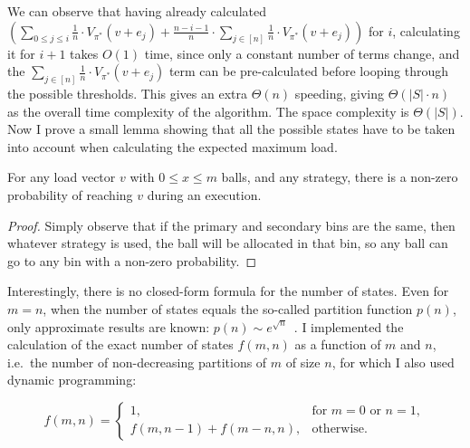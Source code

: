 We can observe that having already calculated $(\sum_{0\leq j \leq i} \frac{1}{n}\cdot V_{\pi^*}(v+e_j) + \frac{n-i-1}{n} \cdot  \sum_{j \in [n]} \frac{1}{n}\cdot V_{\pi^*}(v+e_j))$ for $i$, calculating it for $i+1$ takes $O(1)$ time, since only a constant number of terms change, and the $\sum_{j \in [n]} \frac{1}{n}\cdot V_{\pi^*}(v+e_j)$ term can be pre-calculated before looping through the possible thresholds. This gives an extra $\Theta(n)$ speeding, giving $\Theta(|S|\cdot n)$ as the overall time complexity of the algorithm. The space complexity is $\Theta(|S|)$.\\


Now I prove a small lemma showing that all the possible states have to be taken into account when calculating the expected maximum load.


\begin{lemma} \label{lemma: everystatereachable}
For any load vector $v$ with $0\leq x\leq m$ balls, and any strategy, there is a non-zero probability of reaching $v$ during an execution.
\end{lemma}

\begin{proof}
    Simply observe that if the primary and secondary bins are the same, then whatever strategy is used, the ball will be allocated in that bin, so any ball can go to any bin with a non-zero probability.
\end{proof}




Interestingly, there is no closed-form formula for the number of states.  Even for $m=n$, when the number of states equals the so-called partition function $p(n)$, only approximate results are known: $p(n) \sim e^{\sqrt{n}}$~\cite{hardy1918partitionfunction}. I implemented the calculation of the exact number of states $f(m, n)$ as a function of $m$ and $n$, i.e.\ the number of non-decreasing partitions of $m$ of size $n$, for which I also used dynamic programming:

\begin{equation} \label{eq: numberofpartitions}
    f(m, n) = \begin{cases}
        1, & \text{for } m=0\text{ or } n=1,\\
        f(m,n-1)+f(m-n,n), & \text{otherwise}.
    \end{cases}
\end{equation}


